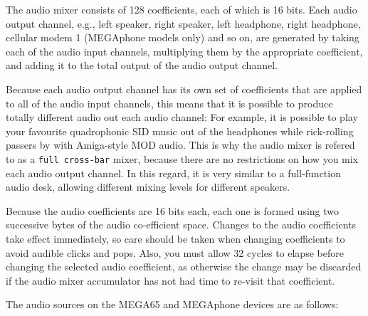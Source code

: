 The audio mixer consists of 128 coefficients, each of which is 16
bits.  Each audio output channel, e.g., left speaker, right speaker,
left headphone, right headphone, cellular modem 1 (MEGAphone models
only) and so on, are generated by taking each of the audio input
channels, multiplying them by the appropriate coefficient, and adding
it to the total output of the audio output channel.

Because each
audio output channel has its own set of coefficients that are applied
to all of the audio input channels, this means that it is possible to
produce totally different audio out each audio channel: For example,
it is possible to play your favourite quadrophonic SID music out of
the headphones while rick-rolling passers by with Amiga-style MOD
audio.  This is why the audio mixer is refered to as a {\tt full
  cross-bar} mixer, because there are no restrictions on how you mix
each audio output channel.  In this regard, it is very similar to a
full-function audio desk, allowing different mixing levels for
different speakers.

Because the audio coefficients are 16 bits each, each one is formed
using two successive bytes of the audio co-efficient space.  Changes
to the audio coefficients take effect immediately, so care should be
taken when changing coefficients to avoid audible clicks and pops.
Also, you must allow 32 cycles to elapse before changing the selected
audio coefficient, as otherwise the change may be discarded if the
audio mixer accumulator has not had time to re-visit that coefficient.

The audio sources on the MEGA65 and MEGAphone devices are as follows:

